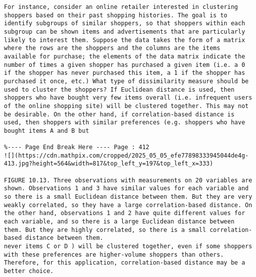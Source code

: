 \documentclass[10pt]{article}
\begin{document}
\begin{verbatim}
For instance, consider an online retailer interested in clustering shoppers based on their past shopping histories. The goal is to identify subgroups of similar shoppers, so that shoppers within each subgroup can be shown items and advertisements that are particularly likely to interest them. Suppose the data takes the form of a matrix where the rows are the shoppers and the columns are the items available for purchase; the elements of the data matrix indicate the number of times a given shopper has purchased a given item (i.e. a 0 if the shopper has never purchased this item, a 1 if the shopper has purchased it once, etc.) What type of dissimilarity measure should be used to cluster the shoppers? If Euclidean distance is used, then shoppers who have bought very few items overall (i.e. infrequent users of the online shopping site) will be clustered together. This may not be desirable. On the other hand, if correlation-based distance is used, then shoppers with similar preferences (e.g. shoppers who have bought items A and B but

%---- Page End Break Here ---- Page : 412
![](https://cdn.mathpix.com/cropped/2025_05_05_efe77898333945044de4g-413.jpg?height=564&width=817&top_left_y=197&top_left_x=333)

FIGURE 10.13. Three observations with measurements on 20 variables are shown. Observations 1 and 3 have similar values for each variable and so there is a small Euclidean distance between them. But they are very weakly correlated, so they have a large correlation-based distance. On the other hand, observations 1 and 2 have quite different values for each variable, and so there is a large Euclidean distance between them. But they are highly correlated, so there is a small correlation-based distance between them.
never items C or D ) will be clustered together, even if some shoppers with these preferences are higher-volume shoppers than others. Therefore, for this application, correlation-based distance may be a better choice.


\end{verbatim}
\end{document}
